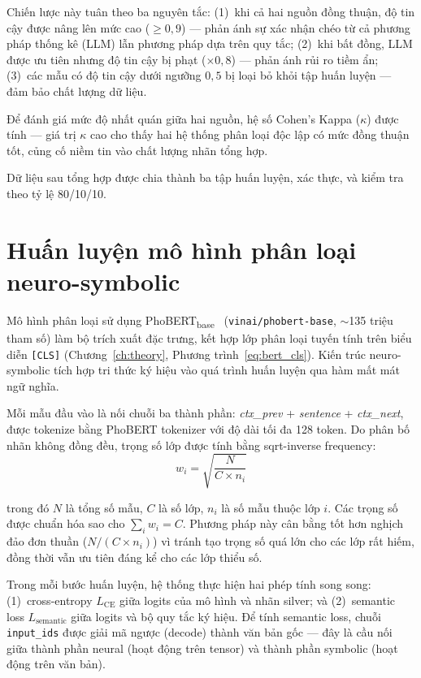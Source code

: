 Chiến lược này tuân theo ba nguyên tắc: (1)~khi cả hai nguồn đồng thuận, độ tin cậy được nâng lên mức cao ($\geq 0{,}9$) --- phản ánh sự xác nhận chéo từ cả phương pháp thống kê (LLM) lẫn phương pháp dựa trên quy tắc; (2)~khi bất đồng, LLM được ưu tiên nhưng độ tin cậy bị phạt ($\times 0{,}8$) --- phản ánh rủi ro tiềm ẩn; (3)~các mẫu có độ tin cậy dưới ngưỡng $0{,}5$ bị loại bỏ khỏi tập huấn luyện --- đảm bảo chất lượng dữ liệu.

Để đánh giá mức độ nhất quán giữa hai nguồn, hệ số Cohen's Kappa ($\kappa$) được tính --- giá trị $\kappa$ cao cho thấy hai hệ thống phân loại độc lập có mức đồng thuận tốt, củng cố niềm tin vào chất lượng nhãn tổng hợp.

Dữ liệu sau tổng hợp được chia thành ba tập huấn luyện, xác thực, và kiểm tra theo tỷ lệ 80/10/10.

\section{Huấn luyện mô hình phân loại neuro-symbolic}
\label{sec:training}

Mô hình phân loại sử dụng PhoBERT\textsubscript{base}~\cite{nguyen2020phobert} (\texttt{vinai/phobert-base}, $\sim$135 triệu tham số) làm bộ trích xuất đặc trưng, kết hợp lớp phân loại tuyến tính trên biểu diễn \texttt{[CLS]} (Chương~\ref{ch:theory}, Phương trình~\ref{eq:bert_cls}). Kiến trúc neuro-symbolic tích hợp tri thức ký hiệu vào quá trình huấn luyện qua hàm mất mát ngữ nghĩa.


Mỗi mẫu đầu vào là nối chuỗi ba thành phần: \textit{ctx\_prev} + \textit{sentence} + \textit{ctx\_next}, được tokenize bằng PhoBERT tokenizer với độ dài tối đa 128 token. Do phân bố nhãn không đồng đều, trọng số lớp được tính bằng sqrt-inverse frequency:
\begin{equation}
    w_i = \sqrt{\frac{N}{C \times n_i}}
    \label{eq:class_weights}
\end{equation}

\noindent trong đó $N$ là tổng số mẫu, $C$ là số lớp, $n_i$ là số mẫu thuộc lớp $i$. Các trọng số được chuẩn hóa sao cho $\sum_i w_i = C$. Phương pháp này cân bằng tốt hơn nghịch đảo đơn thuần ($N / (C \times n_i)$) vì tránh tạo trọng số quá lớn cho các lớp rất hiếm, đồng thời vẫn ưu tiên đáng kể cho các lớp thiểu số.

Trong mỗi bước huấn luyện, hệ thống thực hiện hai phép tính song song: (1)~cross-entropy $L_{\text{CE}}$ giữa logits của mô hình và nhãn silver; và (2)~semantic loss $L_{\text{semantic}}$ giữa logits và bộ quy tắc ký hiệu. Để tính semantic loss, chuỗi \texttt{input\_ids} được giải mã ngược (decode) thành văn bản gốc --- đây là cầu nối giữa thành phần neural (hoạt động trên tensor) và thành phần symbolic (hoạt động trên văn bản).

